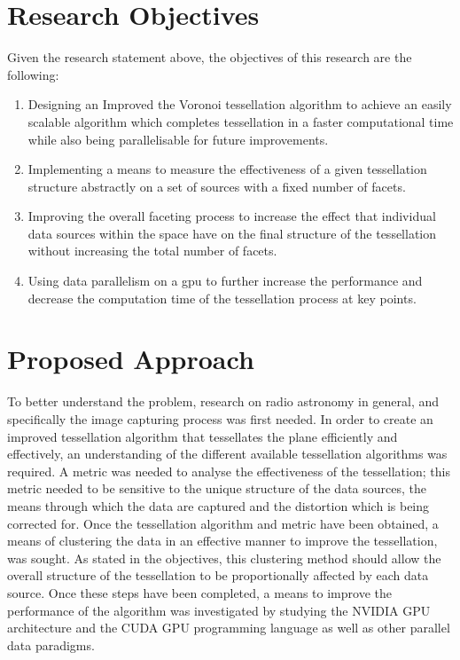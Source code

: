 \section{Research Objectives}\label{int:sec:goals}
Given the research statement above, the objectives of this research are the following:
\begin{enumerate}
\item Designing an Improved the Voronoi tessellation algorithm to achieve an easily scalable algorithm which completes tessellation in a faster computational time while also being parallelisable for future improvements.
\item Implementing a means to measure the effectiveness of a given tessellation structure abstractly on a set of sources with a fixed number of facets.
\item Improving the overall faceting process to increase the effect that individual data sources within the space have on the final structure of the tessellation without increasing the total number of facets.
\item Using data parallelism on a \gls{gpu} to further increase the performance and decrease the computation time of the tessellation process at key points.
\end{enumerate}
\section{Proposed Approach}
To better understand the problem, research on radio astronomy in general, and specifically the image capturing process was first needed. In order to create an improved tessellation algorithm that tessellates the plane efficiently and effectively, an understanding of the different available tessellation algorithms was required. A metric was needed to analyse the effectiveness of the tessellation; this metric needed to be sensitive to the unique structure of the data sources, the means through which the data are captured and the distortion which is being corrected for. Once the tessellation algorithm and metric have been obtained, a means of clustering the data in an effective manner to improve the tessellation, was sought. As stated in the objectives, this clustering method should allow the overall structure of the tessellation to be proportionally affected by each data source. Once these steps have been completed, a means to improve the performance of the algorithm was investigated by studying the NVIDIA GPU architecture and the CUDA GPU programming language as well as other parallel data paradigms.
